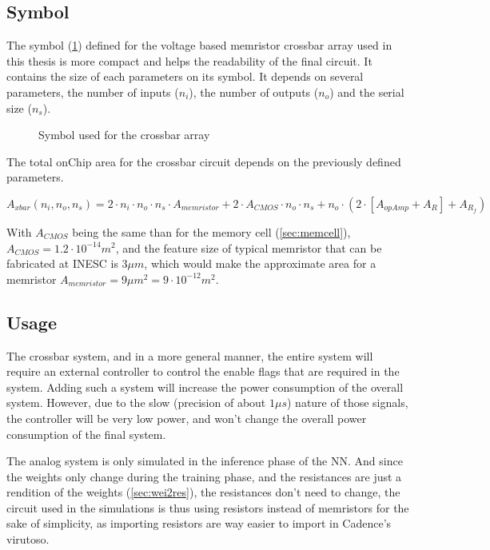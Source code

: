 \subsection{Symbol}
The symbol (\cref{sym:xbar}) defined for the voltage based memristor crossbar array used in this thesis is more compact and helps the readability of the final circuit. It contains the size of each parameters on its symbol. It depends on several parameters, the number of inputs ($n_i$), the number of outputs ($n_o$) and the serial size ($n_s$).

\begin{figure}[H]
  \centering
  
  \caption{Symbol used for the crossbar array}
  \label{sym:xbar}
\end{figure}

The total onChip area for the crossbar circuit depends on the previously defined parameters.

\begin{equation}
  A_{xbar}(n_i,n_o,n_s)=2\cdot n_i\cdot n_o \cdot n_s\cdot A_{memristor}+2\cdot A_{CMOS}\cdot n_o\cdot n_s +n_o\cdot(2\cdot[A_{opAmp}+A_R]+A_{R_f})
\end{equation}

With $A_{CMOS}$ being the same than for the memory cell (\cref{sec:memcell}), $A_{CMOS}=1.2\cdot 10^{-14}m^2$, and the feature size of typical memristor that can be fabricated at INESC is $3\mu m$, which would make the approximate area for a memristor $A_{memristor}=9\mu m^2=9\cdot 10^{-12} m^2$.%

\subsection{Usage}


The crossbar system, and in a more general manner, the entire system will require an external controller to control the enable flags that are required in the system. Adding such a system will increase the power consumption of the overall system. However, due to the slow (precision of about $1\mu s$) nature of those signals, the controller will be very low power, and won't change the overall power consumption of the final system.%

The analog system is only simulated in the inference phase of the \ac{NN}. And since the weights only change during the training phase, and the resistances are just a rendition of the weights (\cref{sec:wei2res}), the resistances don't need to change, the circuit used in the simulations is thus using resistors instead of memristors for the sake of simplicity, as importing resistors are way easier to import in Cadence's virutoso.
